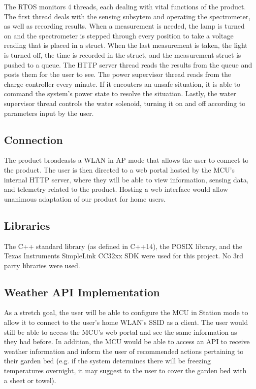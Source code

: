 \documentclass[journal]{IEEEtran}
\begin{document}
The RTOS monitors 4 threads, each dealing with vital functions of the product. 
The first thread deals with the sensing subsytem and operating the spectrometer, 
as well as recording results. When a measurement is needed, the lamp is turned on 
and the spectrometer is stepped through every position to take a voltage reading 
that is placed in a struct. When the last measurement is taken, the light is turned 
off, the time is recorded in the struct, and the measurement struct is pushed to a 
queue. The HTTP server thread reads the results from the queue and posts them for 
the user to see. The power supervisor thread reads from the charge controller every 
minute. If it encouters an unsafe situation, it is able to command the system's power 
state to resolve the situation. Lastly, the water supervisor thread controls the water 
solenoid, turning it on and off according to parameters input by the user.

\subsection{Connection}
The product broadcasts a WLAN in AP mode that allows the user to connect to the product. 
The user is then directed to a web portal hosted by the MCU's internal HTTP server, 
where they will be able to view information, sensing data, and telemetry related to the 
product. Hosting a web interface would allow unanimous adaptation of our product for home users.

\subsection{Libraries}
The C++ standard library (as defined in C++14), the POSIX library, and the Texas 
Instruments SimpleLink CC32xx SDK were used for this project. No 3rd party libraries were used.

\subsection{Weather API Implementation}
As a stretch goal, the user will be able to configure the MCU in Station mode to allow 
it to connect to the user's home WLAN's SSID as a client. The user would still be able 
to access the MCU's web portal and see the same information as they had before. In 
addition, the MCU would be able to access an API to receive weather information and inform 
the user of recommended actions pertaining to their garden bed (e.g. if the system determines 
there will be freezing temperatures overnight, it may suggest to the user to cover the garden bed with a sheet or towel).
\end{document}
